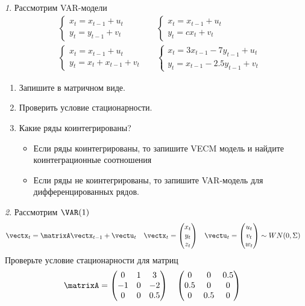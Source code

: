 \documentclass[12pt]{article}
\theoremstyle{remark}
\newtheorem{exercise}{}[subsection]
\begin{document}
\begin{exercise}
Рассмотрим VAR-модели
\begin{align*}
	& \begin{cases} x_t=x_{t-1}+u_t \\ y_t=y_{t-1}+v_t \end{cases} &
	& \begin{cases} x_t=x_{t-1}+u_t \\ y_t=cx_{t}+v_t \end{cases} \\
	& \begin{cases} x_t=x_{t-1}+u_t \\ y_t=x_{t}+x_{t-1}+v_t \end{cases} &
	& \begin{cases} x_t=3x_{t-1}-7y_{t-1}+u_t \\ y_t=x_{t-1}-2.5y_{t-1}+v_t \end{cases}
\end{align*}
\begin{enumerate}
	\item Запишите в матричном виде.
	\item Проверить условие стационарности.
	\item Какие ряды коинтегрированы?
	\begin{itemize}
		\item Если ряды коинтегрированы, то запишите VECM модель
		и найдите коинтеграционные соотношения
		\item Если ряды не коинтегрированы, то запишите VAR-модель для дифференцированных рядов.
	\end{itemize}
\end{enumerate}
\end{exercise}
	
\begin{exercise}
Рассмотрим $\VAR(1)$
\begin{align*}
	\vectx_t&=\matrixA\vectx_{t-1}+\vectu_t &
	\vectx_t&=\begin{pmatrix} x_t \\ y_t \\ z_t \end{pmatrix} &
	\vectu_t&=\begin{pmatrix} u_t \\ v_t \\ w_t \end{pmatrix}\sim WN(0,\Sigma)
\end{align*}
Проверьте условие стационарности для матриц
\begin{align*}
	\matrixA&=\begin{pmatrix}
	0 & 1 & 3 \\ -1 & 0 & -2 \\ 0 & 0 & 0.5 \end{pmatrix} &
	&\begin{pmatrix}
		0 & 0 & 0.5 \\ 0.5 & 0 & 0 \\0 & 0.5 & 0
	\end{pmatrix}
\end{align*}
\end{exercise}
	
\end{document}

